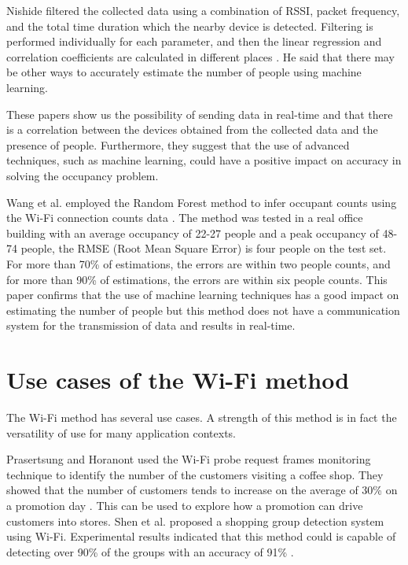 Nishide filtered the collected data using a combination of RSSI, packet frequency, and the total time duration which the nearby device is detected. Filtering is performed individually for each parameter, and then the linear regression and correlation coefficients are calculated  in different places \cite{nishide2019filter}. He said that there may be other ways to accurately estimate the number of people using machine learning.

These papers show us the possibility of sending data in real-time and that there is a correlation between the devices obtained from the collected data and the presence of people. Furthermore, they suggest that the use of advanced techniques, such as machine learning, could have a positive impact on accuracy in solving the occupancy problem.

Wang et al. employed the Random Forest method to infer occupant counts using the Wi-Fi connection counts data \cite{wang2019inferring}. The method was tested in a real office building with an average occupancy of 22-27 people and a peak occupancy of 48-74 people, the RMSE (Root Mean Square Error) is four people on the test set. For more than 70\% of estimations, the errors are within two people counts, and for more than 90\% of estimations, the errors are within six people counts.
This paper confirms that the use of machine learning techniques has a good impact on estimating the number of people but this method does not have a communication system for the transmission of data and results in real-time.


\section{Use cases of the Wi-Fi method}
\label{sec:cases}
\vspace{0.2 cm}

The Wi-Fi method has several use cases. A strength of this method is in fact the versatility of use for many application contexts.

Prasertsung and Horanont used the Wi-Fi probe request frames monitoring technique to identify the number of the customers visiting a coffee shop. They showed that the number of customers tends to increase on the average of 30\% on a promotion day \cite{prasertsung2017does}. This can be used to explore how a promotion can drive customers into stores.
Shen et al. proposed a shopping group detection system using Wi-Fi. Experimental results indicated that this method could is capable of detecting over 90\% of the groups with an accuracy of 91\% \cite{shen2018snow}.

